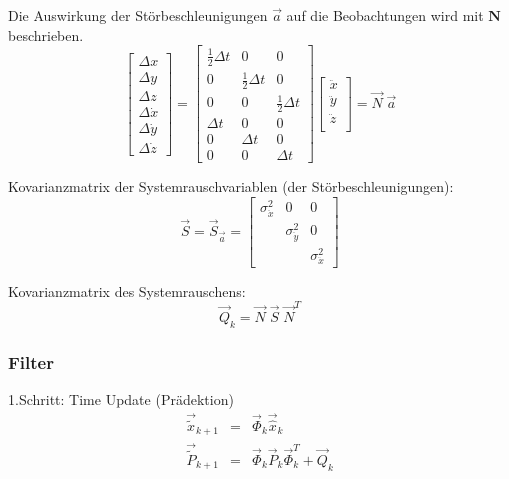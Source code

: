 Die Auswirkung der Störbeschleunigungen $\vec{a}$ auf die Beobachtungen wird mit $\mathbf{N}$ beschrieben.
\begin{equation}
	\begin{bmatrix}\Delta x\\\Delta y\\\Delta z\\\Delta \dot x\\\Delta \dot y\\\Delta \dot z\end{bmatrix} = 
	\begin{bmatrix}
	\frac{1}{2} \Delta t & 0 & 0\\
	0& \frac{1}{2} \Delta t & 0\\
	0& 0 & \frac{1}{2} \Delta t\\
	\Delta t & 0 & 0\\
	0&\Delta t & 0\\
	0& 0 & \Delta t
	\end{bmatrix}
	\begin{bmatrix}
	\ddot x\\
	\ddot y\\
	\ddot z\\
	\end{bmatrix} = \vec{N} \;\vec{a}
\end{equation}

Kovarianzmatrix der Systemrauschvariablen (der Störbeschleunigungen):
\begin{equation}
 	\vec{S} = \vec{S}_{\vec{a}} = \begin{bmatrix}\sigma_{\ddot x}^2 & 0 & 0\\&\sigma_{\ddot y}^2 & 0\\ &&\sigma_{\ddot x}^2\end{bmatrix}
\end{equation}

Kovarianzmatrix des Systemrauschens:
\begin{equation}
 	\vec{Q}_k = \vec{N}\;\vec{S}\;\vec{N}^T
\end{equation}

\subsubsection{Filter}

1.Schritt: Time Update (Prädektion)
\begin{eqnarray}
 	\vec{\tilde{x}}_{k+1} & = & \vec{\Phi}_k \vec{\hat x}_k\\
	\vec{\tilde P}_{k+1} & = & \vec{\Phi}_k \vec{P}_k \vec{\Phi}_k^T + \vec{Q}_k
\end{eqnarray}

